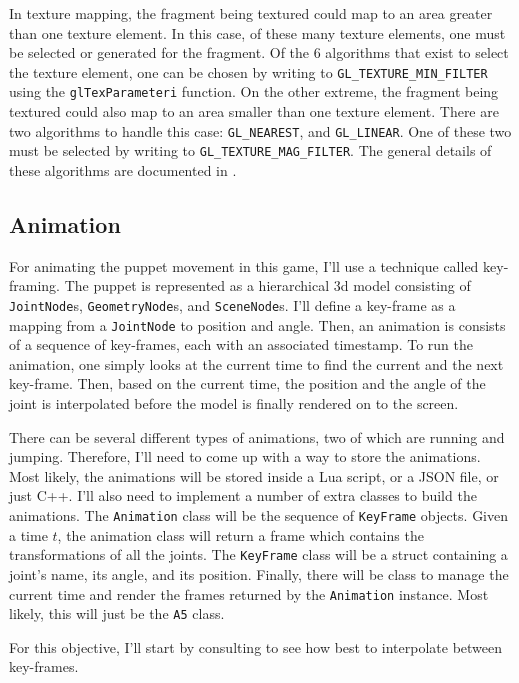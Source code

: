 \documentclass[11pt]{article}
\begin{document}
In texture mapping, the fragment being textured could map to an area greater than one texture element. In this case, of these many texture elements, one must be selected or generated for the fragment. Of the 6 algorithms that exist to select the texture element, one can be chosen by writing to \verb|GL_TEXTURE_MIN_FILTER| using the \verb|glTexParameteri| function. On the other extreme, the fragment being textured could also map to an area smaller than one texture element. There are two algorithms to handle this case: \verb|GL_NEAREST|, and \verb|GL_LINEAR|. One of these two must be selected by writing to \verb|GL_TEXTURE_MAG_FILTER|. The general details of these algorithms are documented in \cite{gl-tex-parameter}.

\subsection{Animation}
For animating the puppet movement in this game, I'll use a technique called key-framing. The puppet is represented as a hierarchical 3d model consisting of \verb|JointNode|s, \verb|GeometryNode|s, and \verb|SceneNode|s. I'll define a key-frame as a mapping from a \verb|JointNode| to position and angle. Then, an animation is consists of a sequence of key-frames, each with an associated timestamp. To run the animation, one simply looks at the current time to find the current and the next key-frame. Then, based on the current time, the position and the angle of the joint is interpolated before the model is finally rendered on to the screen.

There can be several different types of animations, two of which are running and jumping. Therefore, I'll need to come up with a way to store the animations. Most likely, the animations will be stored inside a Lua script, or a JSON file, or just C++. I'll also need to implement a number of extra classes to build the animations. The \verb|Animation| class will be the sequence of \verb|KeyFrame| objects. Given a time $t$, the animation class will return a frame which contains the transformations of all the joints. The \verb|KeyFrame| class will be a struct containing a joint's name, its angle, and its position. Finally, there will be class to manage the current time and render the frames returned by the \verb|Animation| instance. Most likely, this will just be the \verb|A5| class.

For this objective, I'll start by consulting \cite{interactive-computer-graphics} to see how best to interpolate between key-frames.
\end{document}
